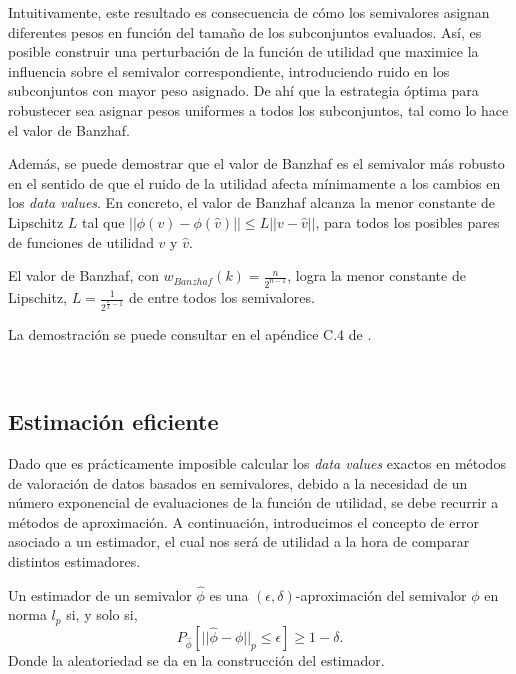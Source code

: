 Intuitivamente, este resultado es consecuencia de cómo los
semivalores asignan diferentes pesos en función del
tamaño de los subconjuntos evaluados. Así, es posible
construir una perturbación de la función de utilidad
que maximice la influencia sobre el semivalor
correspondiente, introduciendo ruido en los subconjuntos
con mayor peso asignado. De ahí que la estrategia
óptima para robustecer sea asignar pesos uniformes a
todos los subconjuntos, tal como lo hace el valor de Banzhaf.

Además, se puede demostrar que el valor de Banzhaf es
el semivalor más robusto en el sentido de que el ruido
de la utilidad afecta mínimamente a los cambios en los
\textit{data values}. En concreto, el valor de
Banzhaf alcanza la menor constante de Lipschitz $L$
tal que $||\phi(v)-\phi(\hat{v})|| \leq L||v-\hat{v}||$,
para todos los posibles pares de funciones de utilidad
$v$ y $\hat{v}$.

\begin{theorem}
  El valor de Banzhaf, con $w_{Banzhaf}(k) = \frac{n}{2^{n-1}}$,
  logra la menor constante de Lipschitz,
  $L = \frac{1}{2^{\frac{n}{2}-1}}$ de entre todos los semivalores.
\end{theorem}

La demostración se puede consultar en el apéndice
C.4 de \cite{dataBanzhaf}.

\

\subsection{Estimación eficiente}

Dado que es prácticamente imposible calcular los
\textit{data values} exactos en métodos de valoración
de datos basados en semivalores, debido a la necesidad
de un número exponencial de evaluaciones de la función
de utilidad, se debe recurrir a métodos de aproximación.
A continuación, introducimos el concepto de error
asociado a un estimador, el cual nos será de utilidad
a la hora de comparar distintos estimadores.

\begin{definition}
  Un estimador de un semivalor $\hat{\phi}$ es \index{$\hat{\phi}$}
  una $(\epsilon,\delta)$-aproximación del semivalor $\phi$ 
  en norma $l_p$ si, y solo si,
  \[
  P_{\hat{\phi}}[||\hat{\phi}-\phi||_p\leq \epsilon] \geq 1-\delta.
  \]
  Donde la aleatoriedad se da en la construcción del estimador.
\end{definition}

